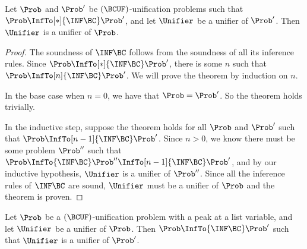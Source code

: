 \begin{Theorem}\label{thm:inf-bc-sound}
    Let $\Prob$ and $\Prob'$ be $(\BCUF)$-unification problems such that $\Prob
    \InfTo[*]{\INF\BC} \Prob'$, and let $\Unifier$ be a unifier of $\Prob'$.
    Then $\Unifier$ is a unifier of $\Prob$.
\end{Theorem}

\begin{proof}
    The soundness of $\INF\BC$ follows from the soundness of all its inference
    rules. Since $\Prob \InfTo[*]{\INF\BC} \Prob'$, there is some $n$ such that
    $\Prob \InfTo[n]{\INF\BC} \Prob'$. We will prove the theorem by induction
    on $n$.

    In the base case when $n = 0$, we have that $\Prob = \Prob'$. So the
    theorem holds trivially.

    In the inductive step, suppose the theorem holds for all $\Prob$ and
    $\Prob'$ such that $\Prob \InfTo[n-1]{\INF\BC} \Prob'$. Since $n > 0$, we
    know there must be some problem $\Prob''$ such that $\Prob \InfTo{\INF\BC}
    \Prob'' \InfTo[n-1]{\INF\BC} \Prob'$, and by our inductive hypothesis,
    $\Unifier$ is a unifier of $\Prob''$. Since all the inference rules of
    $\INF\BC$ are sound, $\Unifier$ must be a unifier of $\Prob$ and the
    theorem is proven.
\end{proof}

\begin{Lemma}\label{lemma:inf-bc-complete}
    Let $\Prob$ be a $(\BCUF)$-unification problem with a peak at a list
    variable, and let $\Unifier$ be a unifier of $\Prob$. Then $\Prob
    \InfTo{\INF\BC} \Prob'$ such that $\Unifier$ is a unifier of $\Prob'$.
\end{Lemma}

